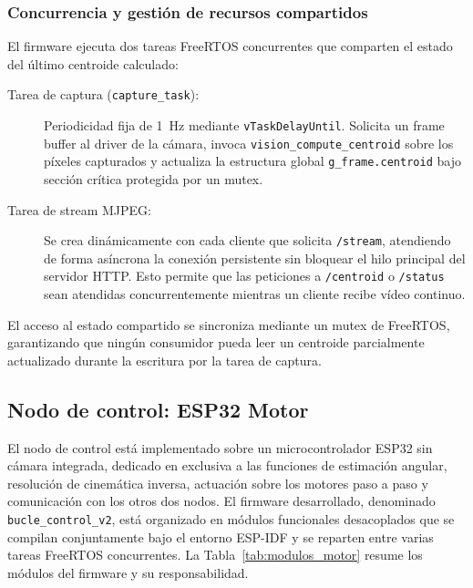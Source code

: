 \subsubsection{Concurrencia y gestión de recursos compartidos}
El firmware ejecuta dos tareas FreeRTOS concurrentes que comparten el estado del último centroide calculado:

\begin{description}
\item[Tarea de captura (\texttt{capture\_task}):] Periodicidad fija de 1~Hz mediante \texttt{vTaskDelayUntil}. Solicita un frame buffer al driver de la cámara, invoca \texttt{vision\_compute\_centroid} sobre los píxeles capturados y actualiza la estructura global \texttt{g\_frame.centroid} bajo sección crítica protegida por un mutex.

\item[Tarea de stream MJPEG:] Se crea dinámicamente con cada cliente que solicita \texttt{/stream}, atendiendo de forma asíncrona la conexión persistente sin bloquear el hilo principal del servidor HTTP. Esto permite que las peticiones a \texttt{/centroid} o \texttt{/status} sean atendidas concurrentemente mientras un cliente recibe vídeo continuo.
\end{description}

El acceso al estado compartido se sincroniza mediante un mutex de FreeRTOS, garantizando que ningún consumidor pueda leer un centroide parcialmente actualizado durante la escritura por la tarea de captura.

\subsection{Nodo de control: ESP32 Motor}
\label{sec:nodo_motor}

El nodo de control está implementado sobre un microcontrolador ESP32 sin cámara integrada, dedicado en exclusiva a las funciones de estimación angular, resolución de cinemática inversa, actuación sobre los motores paso a paso y comunicación con los otros dos nodos. El firmware desarrollado, denominado \texttt{bucle\_control\_v2}, está organizado en módulos funcionales desacoplados que se compilan conjuntamente bajo el entorno ESP-IDF y se reparten entre varias tareas FreeRTOS concurrentes. La Tabla~\ref{tab:modulos_motor} resume los módulos del firmware y su responsabilidad.

